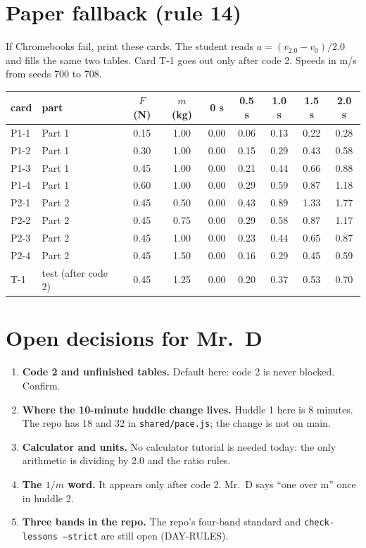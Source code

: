 \documentclass[10pt]{article}
\begin{document}
\section{Paper fallback (rule 14)}
If Chromebooks fail, print these cards. The student reads $a=(v_{2.0}-v_0)/2.0$ and fills the same two tables. Card T-1 goes out only after code 2. Speeds in m/s from seeds 700 to 708.
\begin{center}\small\begin{tabular}{@{}l l c c c c c c c@{}}\toprule card & part & $F$ (N) & $m$ (kg) & 0 s & 0.5 s & 1.0 s & 1.5 s & 2.0 s\\\midrule
P1-1 & Part 1 & 0.15 & 1.00 & 0.00 & 0.06 & 0.13 & 0.22 & 0.28 \\
P1-2 & Part 1 & 0.30 & 1.00 & 0.00 & 0.15 & 0.29 & 0.43 & 0.58 \\
P1-3 & Part 1 & 0.45 & 1.00 & 0.00 & 0.21 & 0.44 & 0.66 & 0.88 \\
P1-4 & Part 1 & 0.60 & 1.00 & 0.00 & 0.29 & 0.59 & 0.87 & 1.18 \\
P2-1 & Part 2 & 0.45 & 0.50 & 0.00 & 0.43 & 0.89 & 1.33 & 1.77 \\
P2-2 & Part 2 & 0.45 & 0.75 & 0.00 & 0.29 & 0.58 & 0.87 & 1.17 \\
P2-3 & Part 2 & 0.45 & 1.00 & 0.00 & 0.23 & 0.44 & 0.65 & 0.87 \\
P2-4 & Part 2 & 0.45 & 1.50 & 0.00 & 0.16 & 0.29 & 0.45 & 0.59 \\
T-1 & test (after code 2) & 0.45 & 1.25 & 0.00 & 0.20 & 0.37 & 0.53 & 0.70 \\
\bottomrule\end{tabular}\end{center}

\section{Open decisions for Mr.\ D}
\begin{enumerate}
\item \textbf{Code 2 and unfinished tables.} Default here: code 2 is never blocked. Confirm.
\item \textbf{Where the 10-minute huddle change lives.} Huddle 1 here is 8 minutes. The repo has 18 and 32 in \texttt{shared/pace.js}; the change is not on main.
\item \textbf{Calculator and units.} No calculator tutorial is needed today: the only arithmetic is dividing by 2.0 and the ratio rules.
\item \textbf{The $1/m$ word.} It appears only after code 2. Mr.\ D says “one over m” once in huddle 2.
\item \textbf{Three bands in the repo.} The repo's four-band standard and \texttt{check-lessons --strict} are still open (DAY-RULES).
\end{enumerate}
\end{document}
